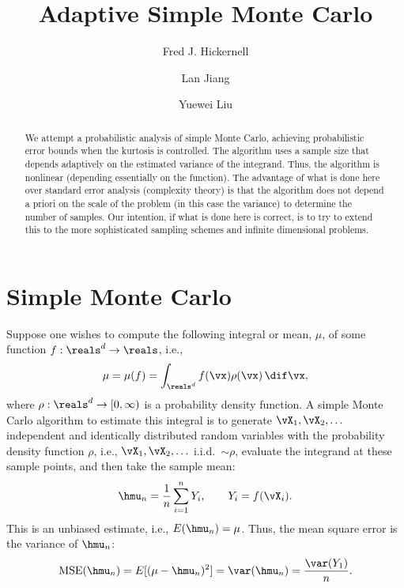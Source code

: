 \documentclass[12pt]{amsart}
\DeclareMathOperator{\MSE}{MSE}
\begin{document}
\title{Adaptive Simple Monte Carlo}
\author{Fred J. Hickernell}
\author{Lan Jiang}
\author{Yuewei Liu}
\address{Room E1-208, Department of Applied Mathematics, Illinois Institute of Technology, 10 W.\ 32$^{\text{nd}}$ St., Chicago, IL 60616}
\address{Room E1-208, Department of Applied Mathematics, Illinois Institute of Technology, 10 W.\ 32$^{\text{nd}}$ St., Chicago, IL 60616}
\address{School of Mathematics and Statistics, Lanzhou University, Lanzhou City, Gansu, China 730000}
\begin{abstract}We attempt a probabilistic analysis of simple Monte Carlo, achieving probabilistic error bounds when the kurtosis is controlled.  The algorithm uses a sample size that depends adaptively on the estimated variance of the integrand.  Thus, the algorithm is nonlinear (depending essentially on the function).  The advantage of what is done here over standard error analysis (complexity theory) is that the algorithm does not depend a priori on the scale of the problem (in this case the variance) to determine the number of samples.   Our intention, if what is done here is correct, is to try to extend this to the more sophisticated sampling schemes and infinite dimensional problems.
\end{abstract}
\maketitle

\section{Simple Monte Carlo}
Suppose one wishes to compute the following integral or mean, $\mu$, of some function $f: \reals^d \to \reals$, i.e.,
\begin{equation*}
\mu= \mu(f) = \int_{\reals^d} f(\vx) \rho(\vx) \, \dif \vx,
\end{equation*}
where $\rho: \reals^d \to [0,\infty)$ is a probability density function.  A simple Monte Carlo algorithm to estimate this integral is to generate $\vX_1, \vX_2, \ldots$ independent and identically distributed random variables with the probability density function $\rho$, i.e., $\vX_1, \vX_2, \ldots$ i.i.d.\ $\sim \rho$, evaluate the integrand at these sample points, and then take the sample mean:
\begin{equation} \label{simpleMCest}
\hmu_n = \frac 1n \sum_{i=1}^n Y_i, \qquad Y_i = f(\vX_i).
\end{equation}
This is an unbiased estimate, i.e., $E(\hmu_n) = \mu$.  Thus, the mean square error is the variance of $\hmu_n$:
\begin{equation}\label{MSE1}
\MSE(\hmu_n) = E[(\mu-\hmu_n)^2]=\var(\hmu_n) = \frac{\var(Y_1)}{n}.
\end{equation}
\end{document}
